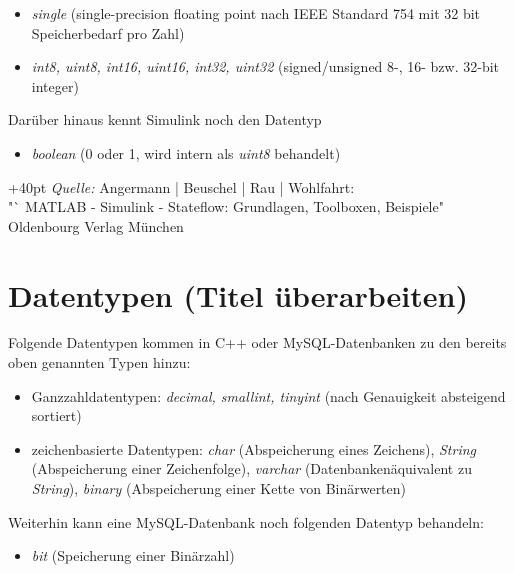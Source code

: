 \documentclass[fontsize = 12pt, paper = a4]{scrreprt}
\begin{document}
{\begin{itemize}
\item \textit{single} (single-precision floating point nach IEEE Standard 754 mit 32 bit Speicherbedarf pro Zahl)

\item \textit{int8, uint8, int16, uint16, int32, uint32} (signed/unsigned 8-, 16- bzw. 32-bit integer)

\end{itemize}

Darüber hinaus kennt Simulink noch den Datentyp

\begin{itemize}

\item \textit{boolean} (0 oder 1, wird intern als \textit{uint8} behandelt)

\end{itemize} 
\hangindent+40pt 
\textit{Quelle:} Angermann | Beuschel | Rau | Wohlfahrt: \\         "` MATLAB - Simulink - Stateflow: Grundlagen, Toolboxen, Beispiele"\ \\
Oldenbourg Verlag München


\section{Datentypen (Titel überarbeiten)}

Folgende Datentypen kommen in C++ oder MySQL-Datenbanken zu den bereits oben genannten Typen hinzu:

\begin{itemize}

\item Ganzzahldatentypen: \textit{decimal, smallint, tinyint} (nach Genauigkeit absteigend sortiert)

\item zeichenbasierte Datentypen: \textit{char} (Abspeicherung eines Zeichens), \textit{String} (Abspeicherung einer Zeichenfolge), \textit{varchar} (Datenbankenäquivalent zu \textit{String}), \textit{binary} (Abspeicherung einer Kette von Binärwerten)

\end{itemize}

Weiterhin kann eine MySQL-Datenbank noch folgenden Datentyp behandeln:

\begin{itemize}

\item \textit{bit} (Speicherung einer Binärzahl)


\end{itemize}}
\end{document}

